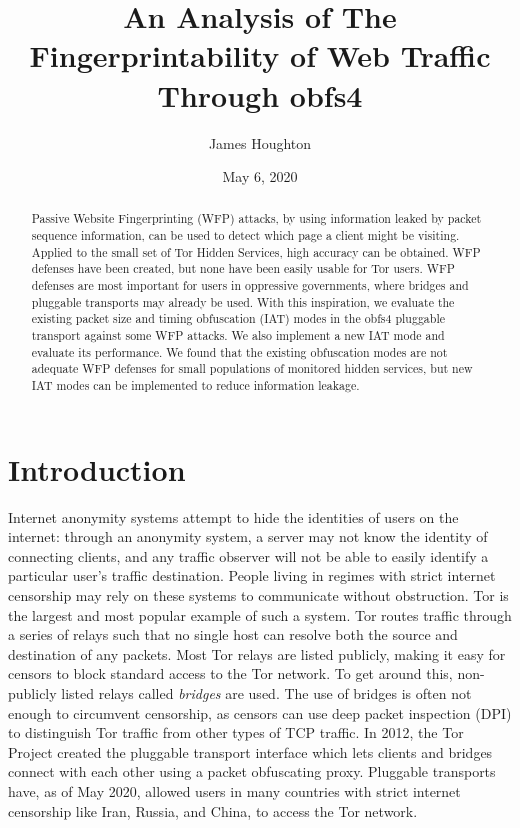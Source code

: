 \documentclass[11pt]{article}
\title{An Analysis of The Fingerprintability of Web Traffic Through obfs4}
\author{James Houghton}
\affil[]{\textit{jth5zs@virginia.edu}}
\date{May 6, 2020}
\begin{document}
\maketitle

\begin{abstract}
Passive Website Fingerprinting (WFP) attacks, by using information leaked by packet sequence information, can be used to detect which page a client might be visiting. Applied to the small set of Tor Hidden Services, high accuracy can be obtained. WFP defenses have been created, but none have been easily usable for Tor users. WFP defenses are most important for users in oppressive governments, where bridges and pluggable transports may already be used. With this inspiration, we evaluate the existing packet size and timing obfuscation (IAT) modes in the obfs4 pluggable transport against some WFP attacks. We also implement a new IAT mode and evaluate its performance. We found that the existing obfuscation modes are not adequate WFP defenses for small populations of monitored hidden services, but new IAT modes can be implemented to reduce information leakage.
\end{abstract}

\section{Introduction}
Internet anonymity systems attempt to hide the identities of users on the internet: through an anonymity system, a server may not know the identity of connecting clients, and any traffic observer will not be able to easily identify a particular user's traffic destination. People living in regimes with strict internet censorship may rely on these systems to communicate without obstruction. Tor\cite{tor} is the largest and most popular example of such a system. Tor routes traffic through a series of relays such that no single host can resolve both the source and destination of any packets. Most Tor relays are listed publicly, making it easy for censors to block standard access to the Tor network. To get around this, non-publicly listed relays called \textit{bridges} are used. The use of bridges is often not enough to circumvent censorship, as censors can use deep packet inspection (DPI) to distinguish Tor traffic from other types of TCP traffic. In 2012, the Tor Project created the pluggable transport interface which lets clients and bridges connect with each other using a packet obfuscating proxy. Pluggable transports have, as of May 2020, allowed users in many countries with strict internet censorship like Iran, Russia, and China, to access the Tor network.
\end{document}
